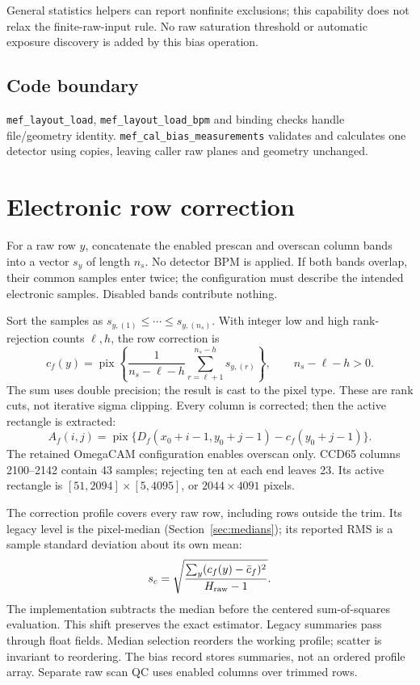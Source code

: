 \documentclass[11pt,a4paper]{article}
\newcommand{\code}[1]{\nolinkurl{#1}}
\newcommand{\pix}{\operatorname{pix}}
\begin{document}
General statistics helpers can report nonfinite exclusions; this capability
does not relax the finite-raw-input rule. No raw saturation threshold or
automatic exposure discovery is added by this bias operation.

\subsection*{Code boundary}
\code{mef_layout_load}, \code{mef_layout_load_bpm} and binding checks handle
file/geometry identity. \code{mef_cal_bias_measurements} validates and calculates
one detector using copies, leaving caller raw planes and geometry unchanged.

\newpage
\section{Electronic row correction}
For a raw row $y$, concatenate the enabled prescan and overscan column bands
into a vector $s_y$ of length $n_s$. No detector BPM is applied. If both bands
overlap, their common samples enter twice; the configuration must describe the
intended electronic samples. Disabled bands contribute nothing.

Sort the samples as $s_{y,(1)}\leq\cdots\leq s_{y,(n_s)}$. With integer low and
high rank-rejection counts $\ell,h$, the row correction is
\begin{equation}
 c_f(y)=\pix\left\{\frac{1}{n_s-\ell-h}
 \sum_{r=\ell+1}^{n_s-h}s_{y,(r)}\right\},\qquad n_s-\ell-h>0. \label{eq:scan}
\end{equation}
The sum uses double precision; the result is cast to the pixel type.
These are rank cuts, not iterative sigma clipping. Every column is corrected;
then the active rectangle is extracted:
\begin{equation}
 A_f(i,j)=\pix\{D_f(x_0+i-1,y_0+j-1)-c_f(y_0+j-1)\}. \label{eq:correct}
\end{equation}
The retained OmegaCAM configuration enables overscan only. CCD65 columns
2100--2142 contain 43 samples; rejecting ten at each end leaves 23.
Its active rectangle is $[51,2094]\times[5,4095]$, or $2044\times4091$ pixels.

The correction profile covers every raw row, including rows outside the trim.
Its legacy level is the pixel-median (Section~\ref{sec:medians}); its reported
RMS is a sample standard deviation about its own mean:
\[
 s_c=\sqrt{\frac{\sum_y(c_f(y)-\bar c_f)^2}{H_{\rm raw}-1}}.
\]
The implementation subtracts the median before the centered sum-of-squares
evaluation. This shift preserves the exact estimator. Legacy summaries pass
through float fields. Median selection reorders the working profile; scatter
is invariant to reordering. The bias record stores summaries, not an ordered
profile array. Separate raw scan QC uses enabled columns over trimmed rows.
\end{document}
